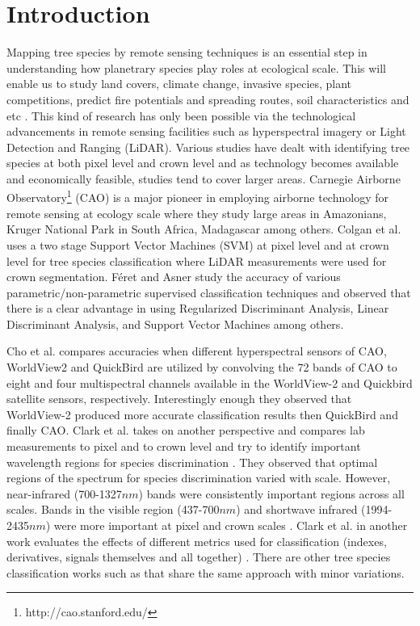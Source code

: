 \documentclass[remotesensing,article,accept,moreauthors,pdftex,12pt,a4paper]{mdpi}
\begin{document}
\section{Introduction}




Mapping tree species by remote sensing techniques is an essential step in understanding how planetrary species play roles at ecological scale. 
This will enable us to study land covers, climate change, invasive species, plant competitions, predict fire potentials and spreading routes, soil characteristics and etc \cite{scholes1997tree, colgan2012mapping}. This kind of research has only been possible via the technological advancements in remote sensing facilities such as hyperspectral imagery or Light Detection and Ranging (LiDAR). 
Various studies have dealt with identifying tree species at both pixel level and crown level and as technology becomes available and economically feasible, studies tend to cover larger areas. 
Carnegie Airborne Observatory\footnote{http://cao.stanford.edu/} (CAO)  is a major pioneer in employing airborne technology for remote sensing at ecology scale where they study large areas in Amazonians, Kruger National Park in South Africa, Madagascar among others.
 Colgan et al. \cite{colgan2012mapping} uses a two stage Support Vector Machines (SVM) at pixel level and at crown level for tree species classification where LiDAR measurements were used for crown segmentation. 
 F\'{e}ret and Asner \cite{feret2013tree} study the accuracy of various parametric/non-parametric supervised classification techniques and observed that there is a clear advantage in using Regularized Discriminant Analysis, Linear Discriminant Analysis, and Support Vector Machines among others. 



Cho et al. \cite{cho2012mapping} compares accuracies when different hyperspectral sensors of CAO, WorldView2 and QuickBird are utilized by convolving the 72 bands of CAO to eight and four multispectral channels available in the WorldView-2 and Quickbird satellite sensors, respectively. 
Interestingly enough they observed that WorldView-2 produced more accurate classification results then QuickBird and finally CAO. 
Clark et al. takes on another perspective and compares lab measurements to pixel and to crown level and try to identify important wavelength regions for species discrimination \cite{clark2005hyperspectral}. 
They observed that optimal regions of the spectrum for species discrimination varied with scale. However, near-infrared (700-1327$nm$) bands were consistently important regions across all scales. 
Bands in the visible region (437-700$nm$) and shortwave infrared (1994-2435$nm$) were more important at pixel and crown scales  \cite{clark2005hyperspectral}. 
Clark et al. in another work evaluates the effects of different metrics used for classification (indexes, derivatives, signals themselves and all together) \cite{clark2012species}. 
There are other tree species classification works such as \cite{dalponte2014tree, feret2012semi, feret2013tree, ghosh2014framework, immitzer2012tree, naidoo2012classification, ustin2009retrieval} that share the same approach with minor variations. 
\end{document}

